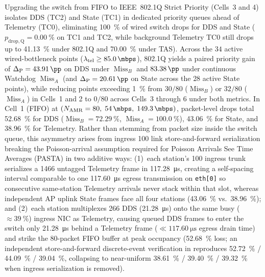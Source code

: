 \documentclass[11pt,a4paper]{article}
\newcommand{\Namr}{\ensuremath{N_{\mathrm{AMR}}}}
\newcommand{\ltel}{\ensuremath{\lambda_{\mathrm{tel}}}}
\newcommand{\MissA}{\ensuremath{\operatorname{Miss}_A}}
\newcommand{\MissB}{\ensuremath{\operatorname{Miss}_B}}
\newcommand{\GainP}{\ensuremath{\Delta_{\mathrm{P}}}}
\begin{document}
Upgrading the switch from FIFO to IEEE~802.1Q Strict Priority (Cells~3 and 4) isolates DDS (TC2) and State (TC1) in dedicated priority queues ahead of Telemetry (TC0), eliminating \qty{100}{\percent} of wired switch drops for DDS and State ($p_{\mathrm{drop,Q}} = \qty{0.00}{\percent}$ on TC1 and TC2, while background Telemetry TC0 still drops up to \qty{41.13}{\percent} under 802.1Q and \qty{70.00}{\percent} under TAS). Across the $34$ active wired-bottleneck points ($\ltel \ge \qty{85.0}{\mbps}$), 802.1Q yields a paired priority gain of $\GainP = \qty{+43.91}{\pp}$ on DDS under $\MissB$ and $\qty{+83.38}{\pp}$ under continuous Watchdog $\MissA$ (and $\GainP = \qty{+20.61}{\pp}$ on State across the $28$ active State points), while reducing points exceeding \qty{1}{\percent} from $30/80$ ($\MissB$) or $32/80$ ($\MissA$) in Cells~1 and 2 to $0/80$ across Cells~3 through 6 under both metrics. In Cell~1 (FIFO) at $(\Namr=80,\; \qty{54}{\mbps},\; \qty{149.3}{\mbps})$, packet-level drops total \qty{52.68}{\percent} for DDS ($\MissB = \qty{72.29}{\percent}$, $\MissA = \qty{100.0}{\percent}$), \qty{43.06}{\percent} for State, and \qty{38.96}{\percent} for Telemetry. Rather than stemming from packet size inside the switch queue, this asymmetry arises from ingress \qty{100}{\mbps} link store-and-forward serialization breaking the Poisson-arrival assumption required for Poisson Arrivals See Time Averages (PASTA) in two additive ways: (1)~each station's \qty{100}{\mbps} ingress trunk serializes a \qty{1466}{\byte} untagged Telemetry frame in \qty{117.28}{\micro\second}, creating a self-spacing interval comparable to one \qty{117.60}{\micro\second} egress transmission on \texttt{eth[0]} so consecutive same-station Telemetry arrivals never stack within that slot, whereas independent AP uplink State frames face all four stations (\qty{43.06}{\percent} vs.\ \qty{38.96}{\percent}); and (2)~each station multiplexes \qty{266}{\byte} DDS (\qty{21.28}{\micro\second}) onto the same busy ($\approx \qty{39}{\percent}$) ingress NIC as Telemetry, causing queued DDS frames to enter the switch only \qty{21.28}{\micro\second} behind a Telemetry frame ($\ll \qty{117.60}{\micro\second}$ egress drain time) and strike the 80-packet FIFO buffer at peak occupancy (\qty{52.68}{\percent} loss; an independent store-and-forward discrete-event verification in  reproduces \qty{52.72}{\percent} / \qty{44.09}{\percent} / \qty{39.04}{\percent}, collapsing to near-uniform \qty{38.61}{\percent} / \qty{39.40}{\percent} / \qty{39.32}{\percent} when ingress serialization is removed).
\end{document}
